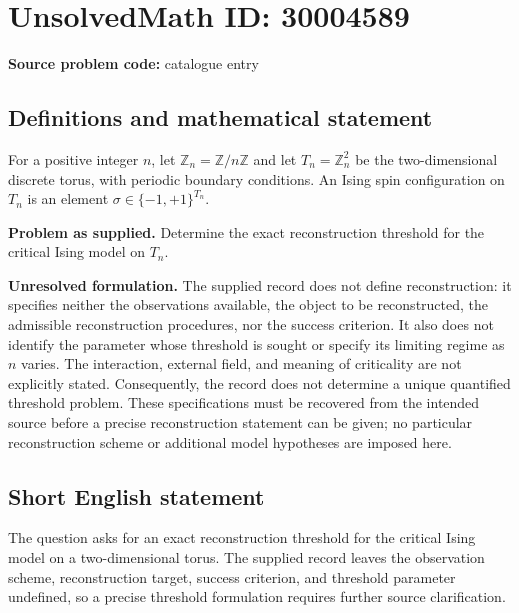 \documentclass[11pt]{article}
\newcommand{\Z}{\mathbb{Z}}
\begin{document}
\section*{UnsolvedMath ID: 30004589}
\textbf{Source problem code:} catalogue entry
\subsection{Definitions and mathematical statement}
For a positive integer \(n\), let \(\mathbb Z_n=\Z/n\Z\) and let \(T_n=\mathbb Z_n^2\) be the two-dimensional discrete torus, with periodic boundary conditions. An Ising spin configuration on \(T_n\) is an element \(\sigma\in\{-1,+1\}^{T_n}\).

\textbf{Problem as supplied.} Determine the exact reconstruction threshold for the critical Ising model on \(T_n\).

\textbf{Unresolved formulation.} The supplied record does not define reconstruction: it specifies neither the observations available, the object to be reconstructed, the admissible reconstruction procedures, nor the success criterion. It also does not identify the parameter whose threshold is sought or specify its limiting regime as \(n\) varies. The interaction, external field, and meaning of criticality are not explicitly stated. Consequently, the record does not determine a unique quantified threshold problem. These specifications must be recovered from the intended source before a precise reconstruction statement can be given; no particular reconstruction scheme or additional model hypotheses are imposed here.
\subsection{Short English statement}
The question asks for an exact reconstruction threshold for the critical Ising model on a two-dimensional torus. The supplied record leaves the observation scheme, reconstruction target, success criterion, and threshold parameter undefined, so a precise threshold formulation requires further source clarification.
\end{document}
